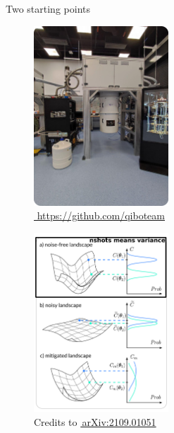 \documentclass[8pt, xcolor={svgnames}, hyperref={linkcolor=black}]{beamer}
\begin{document}
\begin{frame}{Two starting points}
\begin{multicols}{2}
\begin{figure}
\includegraphics[width=0.45\textwidth, height=0.8\textheight]{figures/tii_lab.png}
\caption*{\href{https://github.com/qiboteam}{\faGithub\,\,https://github.com/qiboteam}}
\end{figure}
\begin{figure}
\includegraphics[width=0.45\textwidth, height=0.8\textheight]{figures/NIBP_1.png}
\caption*{Credits to \href{https://arxiv.org/abs/2109.01051}{\faBook\,arXiv:2109.01051}}
\end{figure}
\end{multicols}
\end{frame}
\end{document}
